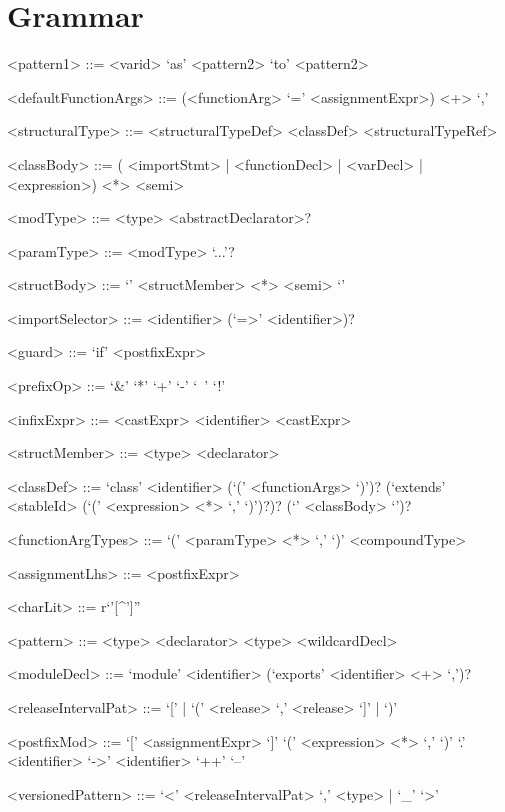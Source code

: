 \documentclass[10pt,letterpaper]{article}
\begin{document}
\section{Grammar}

\begin{grammar}
<pattern1> ::= <varid> `as' <pattern2>
     `to' <pattern2>
  
  <defaultFunctionArgs> ::= (<functionArg> `=' <assignmentExpr>) <+> `,'
  
  <structuralType> ::= <structuralTypeDef>
    \alt <classDef>
    \alt <structuralTypeRef>
  
  <classBody> ::= (
    <importStmt> |
    <functionDecl> |
    <varDecl> |
    <expression>) <*> <semi>
  
  <modType> ::= <type> <abstractDeclarator>?
  
  <paramType> ::= <modType> `...'?
  
  <structBody> ::= `{' <structMember> <*> <semi> `}'
  
  <importSelector> ::= <identifier> (`=>' <identifier>)?
  
  <guard> ::= `if' <postfixExpr>
  
  <prefixOp> ::= `&'
    \alt `*'
    \alt `+'
    \alt `-'
    \alt `~'
    \alt `!'
  
  <infixExpr> ::= <castExpr> <identifier> <castExpr>
  
  <structMember> ::= <type> <declarator>
  
  <classDef> ::= `class' <identifier> (`(' <functionArgs> `)')? (`extends' <stableId> (`(' <expression> <*> `,' `)')?)? (`{' <classBody> `}')?
  
  <functionArgTypes> ::= `(' <paramType> <*> `,' `)'
    \alt <compoundType>
  
  <assignmentLhs> ::= <postfixExpr>
  
  <charLit> ::= r`'[^']''
  
  <pattern> ::= <type> <declarator>
    \alt <type> <wildcardDecl>
  
  <moduleDecl> ::= `module' <identifier> (`exports' <identifier> <+> `,')?
  
  <releaseIntervalPat> ::= 
    `[' |
    `(' <release> `,' <release> 
    `]' |
    `)'
  
  <postfixMod> ::= `[' <assignmentExpr> `]'
    \alt `(' <expression> <*> `,' `)'
    \alt `.' <identifier>
    \alt `->' <identifier>
    \alt `++'
    \alt `--'
  
  <versionedPattern> ::= `<' <releaseIntervalPat> `,' 
    <type> |
    `_' `>'
  

\end{grammar}
\end{document}
